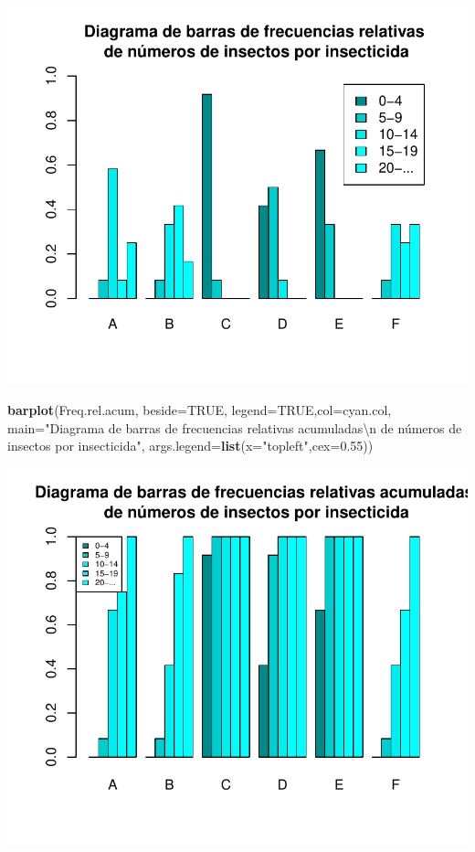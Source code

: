 \documentclass[
]{book}
\newenvironment{Shaded}{\begin{snugshade}}{\end{snugshade}}
\newcommand{\CharTok}[1]{\textcolor[rgb]{0.31,0.60,0.02}{#1}}
\newcommand{\DataTypeTok}[1]{\textcolor[rgb]{0.13,0.29,0.53}{#1}}
\newcommand{\FloatTok}[1]{\textcolor[rgb]{0.00,0.00,0.81}{#1}}
\newcommand{\KeywordTok}[1]{\textcolor[rgb]{0.13,0.29,0.53}{\textbf{#1}}}
\newcommand{\NormalTok}[1]{#1}
\newcommand{\OtherTok}[1]{\textcolor[rgb]{0.56,0.35,0.01}{#1}}
\newcommand{\StringTok}[1]{\textcolor[rgb]{0.31,0.60,0.02}{#1}}
\theoremstyle{definition}
\theoremstyle{definition}
\theoremstyle{definition}
\theoremstyle{remark}
\begin{document}
\begin{center}\includegraphics[width=0.9\linewidth]{11chap11_Descripcion_ordinales_files/figure-latex/unnamed-chunk-36-1} \end{center}

\begin{Shaded}
\begin{Highlighting}[]
\KeywordTok{barplot}\NormalTok{(Freq.rel.acum, }\DataTypeTok{beside=}\OtherTok{TRUE}\NormalTok{, }\DataTypeTok{legend=}\OtherTok{TRUE}\NormalTok{,}\DataTypeTok{col=}\NormalTok{cyan.col, }
  \DataTypeTok{main=}\StringTok{"Diagrama de barras de frecuencias relativas acumuladas}\CharTok{\textbackslash{}n}\StringTok{ de números de insectos por insecticida"}\NormalTok{, }
  \DataTypeTok{args.legend=}\KeywordTok{list}\NormalTok{(}\DataTypeTok{x=}\StringTok{"topleft"}\NormalTok{,}\DataTypeTok{cex=}\FloatTok{0.55}\NormalTok{))}
\end{Highlighting}
\end{Shaded}

\begin{center}\includegraphics[width=0.9\linewidth]{11chap11_Descripcion_ordinales_files/figure-latex/unnamed-chunk-37-1} \end{center}
\end{document}
